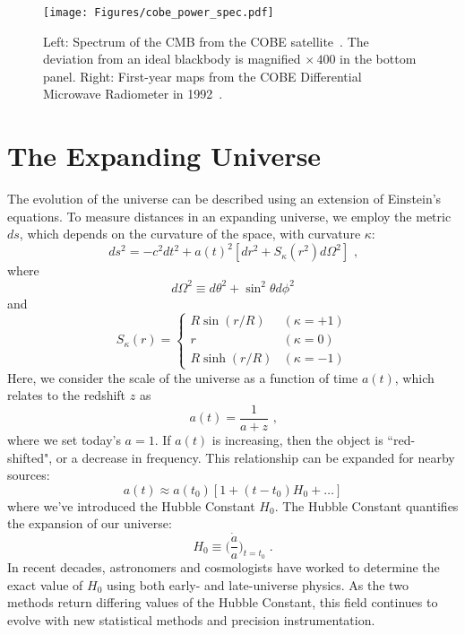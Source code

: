 \begin{figure}[t]
    \centering
    \texttt{[image: Figures/cobe\_power\_spec.pdf]}
    \caption{Left: Spectrum of the CMB from the COBE satellite~\cite{1994ApJ...420..439M}.  The deviation from an ideal blackbody is magnified $\times\,400$ in the bottom panel.  Right: First-year maps from the COBE Differential Microwave Radiometer in 1992~\cite{1992ApJ...396L...1S}.}
    \label{fig:cobe_power_spectra}
\end{figure}

\section{The Expanding Universe}
The evolution of the universe can be described using an extension of Einstein's equations.  To measure distances in an expanding universe, we employ the metric $ds$, which depends on the curvature of the space, with curvature $\kappa$:
\begin{equation}
    ds^2 = -c^2dt^2 + a(t)^2[dr^2 + S_\kappa (r^2)d\Omega^2]\text{ ,}
\end{equation}
where
\begin{equation}
    d\Omega^2\equiv d\theta^2 + \sin^2\theta d\phi^2
\end{equation}
and
\begin{equation}
    S_\kappa(r) = \begin{cases} R\sin(r/R) & (\kappa = +1) \\
  r & (\kappa = 0) \\
   R\sinh(r/R) & (\kappa = -1)\end{cases}
\end{equation}
Here, we consider the scale of the universe as a function of time $a(t)$, which relates to the redshift $z$ as
\begin{equation}
    a(t) = \frac{1}{a+z}\text{ ,}
\end{equation}
where we set today's $a=1$.  If $a(t)$ is increasing, then the object is ``red-shifted", or a decrease in frequency.  This relationship can be expanded for nearby sources:
\begin{equation}
    a(t)\approx a(t_0)[1+(t-t_0)H_0+ \ldots ]
\end{equation}
where we've introduced the Hubble Constant $H_0$.  The Hubble Constant quantifies the expansion of our universe:
\begin{equation}
    H_0\equiv \bigg(\frac{\dot{a}}{a}\bigg )_{t=t_0}\; .
\end{equation}
In recent decades, astronomers and cosmologists have worked to determine the exact value of $H_0$ using both early- and late-universe physics.  As the two methods return differing values of the Hubble Constant, this field continues to evolve with new statistical methods and precision instrumentation.

